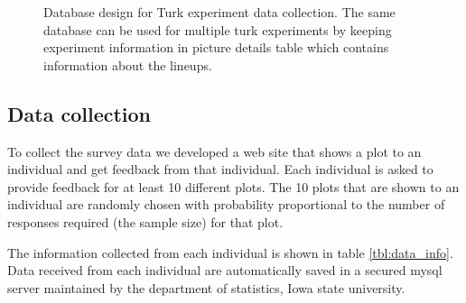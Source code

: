 \documentclass[11pt]{article}
\begin{document}
\begin{figure}[hbtp]
   \centering
       \caption{Database design for Turk experiment data collection. The same database can be used for multiple turk experiments by keeping experiment information in picture details table which contains information about the lineups.}
       \label{fig:turk_database_design}
\end{figure}

\subsection{Data collection} To collect the survey data we developed a web site that shows a plot to an individual and get feedback from that individual. Each individual is asked to provide feedback for at least 10 different plots. The 10 plots that are shown to an individual are randomly chosen with probability proportional to the number of responses required (the sample size) for that plot.

The information collected from each individual is shown in table \ref{tbl:data_info}. Data received from each individual are automatically saved in a secured mysql server maintained by the department of statistics, Iowa state university. 
\end{document}
